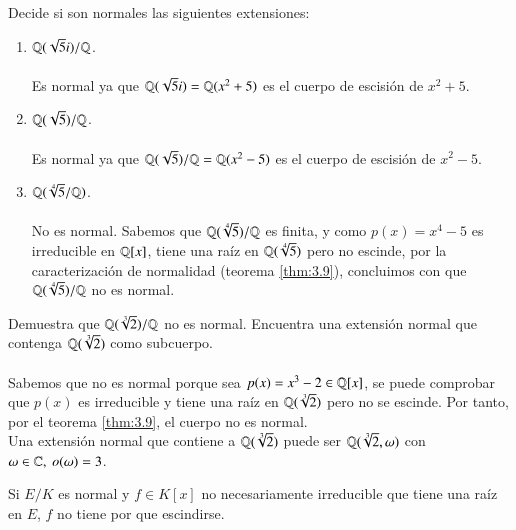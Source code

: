 \begin{ex}[H3.5]
    Decide si son normales las siguientes extensiones:
    \begin{enumerate}
        \item $\mathbb{Q}(\sqrt{5}i)/\mathbb{Q}$.\\\\

        Es normal ya que $\mathbb{Q}(\sqrt{5}i) = \mathbb{Q}(x^2+5)$ es el cuerpo de escisión de $x^2+5$.
        \item $\mathbb{Q}(\sqrt{5})/\mathbb{Q}$.\\\\

        Es normal ya que $\mathbb{Q}(\sqrt{5})/\mathbb{Q} = \mathbb{Q}(x^2-5)$ es el cuerpo de escisión de $x^2-5$.

        \item $\mathbb{Q}(\sqrt[4]{5}/\mathbb{Q})$.\\\\

        No es normal. Sabemos que $\mathbb{Q}(\sqrt[4]{5})/\mathbb{Q}$ es finita, y como $p(x) = x^4 - 5$ es irreducible en $\mathbb{Q}[x]$, tiene una raíz en $\mathbb{Q}(\sqrt[4]{5})$ pero no escinde, por la caracterización de normalidad (teorema \ref{thm:3.9}), concluimos con que $\mathbb{Q}(\sqrt[4]{5})/\mathbb{Q}$ no es normal.
    \end{enumerate}
\end{ex}

\begin{ex}[H3.6]
    Demuestra que $\mathbb{Q}(\sqrt[3]{2})/\mathbb{Q}$ no es normal. Encuentra una extensión normal que contenga $\mathbb{Q}(\sqrt[3]{2})$ como subcuerpo.\\\\

    Sabemos que no es normal porque sea $p(x) = x^3 - 2 \in \mathbb{Q}[x]$, se puede comprobar que $p(x)$ es irreducible y tiene una raíz en $\mathbb{Q}(\sqrt[3]{2})$ pero no se escinde. Por tanto, por el teorema \ref{thm:3.9}, el cuerpo no es normal.\\
    Una extensión normal que contiene a $\mathbb{Q}(\sqrt[3]{2})$ puede ser $\mathbb{Q}(\sqrt[3]{2}, \omega)$ con $\omega \in \mathbb{C},\ o(\omega) = 3$.
\end{ex}

\begin{obs}
    Si $E/K$ es normal y $f\in K[x]$ no necesariamente irreducible que tiene una raíz en $E$, $f$ no tiene por que escindirse.
\end{obs}
